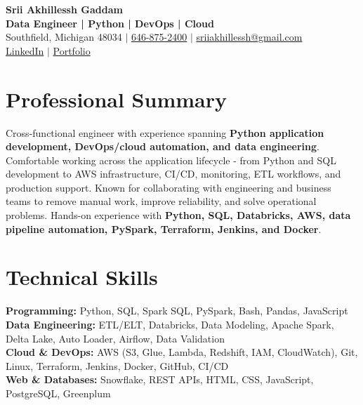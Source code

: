 \documentclass[letterpaper,10pt]{article}
\begin{document}
\fontsize{9.35pt}{10.45pt}\selectfont

\begin{center}
    {\LARGE \textbf{Srii Akhillessh Gaddam}} \\[-1pt]
    \textbf{Data Engineer | Python | DevOps | Cloud} \\[2pt]
    Southfield, Michigan 48034 $|$
    \href{tel:6468752400}{646-875-2400} $|$
    \href{mailto:sriiakhillessh@gmail.com}{sriiakhillessh@gmail.com} \\[1pt]
    \href{https://www.linkedin.com/in/srii-akhiilessh-gaddam-b48668191/}{LinkedIn} $|$
    \href{https://sriiakhillesshg.github.io/portfolio/}{Portfolio}
\end{center}
\vspace{-8pt}

\section{Professional Summary}
\small{Cross-functional engineer with experience spanning \textbf{Python application development, DevOps/cloud automation, and data engineering}. Comfortable working across the application lifecycle - from Python and SQL development to AWS infrastructure, CI/CD, monitoring, ETL workflows, and production support. Known for collaborating with engineering and business teams to remove manual work, improve reliability, and solve operational problems. Hands-on experience with \textbf{Python, SQL, Databricks, AWS, data pipeline automation, PySpark, Terraform, Jenkins, and Docker}.}

\section{Technical Skills}
\small{
\textbf{Programming:} Python, SQL, Spark SQL, PySpark, Bash, Pandas, JavaScript \\
\textbf{Data Engineering:} ETL/ELT, Databricks, Data Modeling, Apache Spark, Delta Lake, Auto Loader, Airflow, Data Validation \\
\textbf{Cloud \& DevOps:} AWS (S3, Glue, Lambda, Redshift, IAM, CloudWatch), Git, Linux, Terraform, Jenkins, Docker, GitHub, CI/CD \\
\textbf{Web \& Databases:} Snowflake, REST APIs, HTML, CSS, JavaScript, PostgreSQL, Greenplum
}

\end{document}
